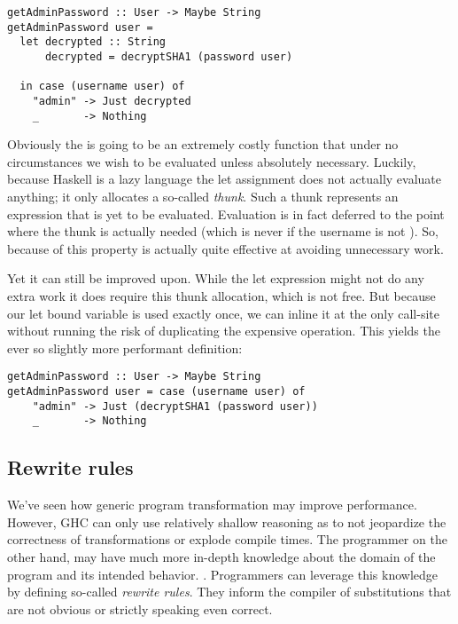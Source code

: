 \begin{listing}[H]
\begin{verbatim}
getAdminPassword :: User -> Maybe String
getAdminPassword user = 
  let decrypted :: String
      decrypted = decryptSHA1 (password user)

  in case (username user) of
    "admin" -> Just decrypted
    _       -> Nothing
\end{verbatim}
\end{listing}

Obviously the  is going to be an extremely costly function that under no
circumstances we wish to be evaluated unless absolutely necessary. Luckily, because Haskell is a
lazy language the let assignment does not actually evaluate anything; it only allocates a so-called
\textit{thunk}. Such a thunk represents an expression that is yet to be evaluated. Evaluation is
in fact deferred to the point where the thunk is actually needed (which is never if the username is
not ). So, because of this property  is actually quite effective 
at avoiding unnecessary work. 

Yet it can still be improved upon. While the let expression might not do any extra work it does require
this thunk allocation, which is not free. But because our let bound variable  
is used exactly once, we can inline it at the only call-site without running the risk of duplicating 
the expensive operation. This yields the ever so slightly more performant definition:

\begin{listing}[H]
\begin{verbatim}
getAdminPassword :: User -> Maybe String
getAdminPassword user = case (username user) of
    "admin" -> Just (decryptSHA1 (password user))
    _       -> Nothing
\end{verbatim}
\end{listing}

\subsection{Rewrite rules}
\label{section:introduction:rewrite_rules}

We've seen how generic program transformation may improve performance. However, GHC can only use relatively
shallow reasoning as to not jeopardize the correctness of transformations or explode compile times. 
The programmer on the other hand, may have much more in-depth knowledge about the domain of the program 
and its intended behavior. \cite{playing_by_the_rules}.
Programmers can leverage this knowledge by defining so-called \textit{rewrite rules}. They inform the compiler of
substitutions that are not obvious or strictly speaking even correct.  

